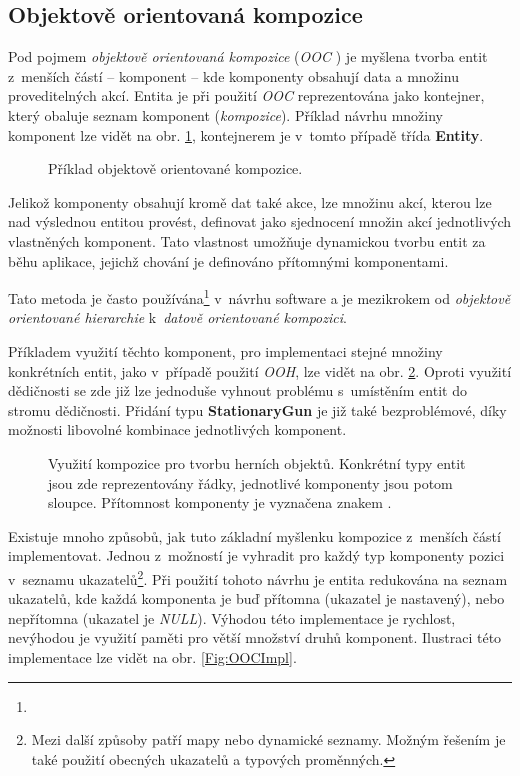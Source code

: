 \subsection{Objektově orientovaná kompozice}

Pod pojmem \emph{objektově orientovaná kompozice} (\emph{OOC} \cite{GameDesignPatterns}) je myšlena tvorba entit z~menších částí -- komponent -- kde komponenty obsahují data a množinu proveditelných akcí. Entita je při použití \emph{OOC} reprezentována jako kontejner, který obaluje seznam komponent (\emph{kompozice}). Příklad návrhu množiny komponent lze vidět na obr. \ref{Fig:OOCHierarchy}, kontejnerem je v~tomto případě třída \textbf{Entity}.

\begin{figure}[H]
	\centering
	\caption{Příklad objektově orientované kompozice.}
	\label{Fig:OOCHierarchy}
\end{figure}

Jelikož komponenty obsahují kromě dat také akce, lze množinu akcí, kterou lze nad výslednou entitou provést, definovat jako sjednocení množin akcí jednotlivých vlastněných komponent. Tato vlastnost umožňuje dynamickou tvorbu entit za běhu aplikace, jejichž chování je definováno přítomnými komponentami.

Tato metoda je často používána\footnote{} v~návrhu software a je mezikrokem od \emph{objektově orientované hierarchie} k~\emph{datově orientované kompozici}. 

Příkladem využití těchto komponent, pro implementaci stejné množiny konkrétních entit, jako v~případě použití \emph{OOH}, lze vidět na obr. \ref{Fig:OOCEntity}. Oproti využití dědičnosti se zde již lze jednoduše vyhnout problému s~umístěním entit do stromu dědičnosti. Přidání typu \textbf{StationaryGun} je již také bezproblémové, díky možnosti libovolné kombinace jednotlivých komponent.

\begin{figure}[H]
	\centering
	\caption{Využití kompozice pro tvorbu herních objektů. Konkrétní typy entit jsou zde reprezentovány řádky, jednotlivé komponenty jsou potom sloupce. Přítomnost komponenty je vyznačena znakem .}
	\label{Fig:OOCEntity}
\end{figure}

Existuje mnoho způsobů, jak tuto základní myšlenku kompozice z~menších částí implementovat. Jednou z~možností je vyhradit pro každý typ komponenty pozici v~seznamu ukazatelů\footnote{Mezi další způsoby patří mapy nebo dynamické seznamy. Možným řešením je také použití obecných ukazatelů a typových proměnných. }. Při použití tohoto návrhu je entita redukována na seznam ukazatelů, kde každá komponenta je buď přítomna (ukazatel je nastavený), nebo nepřítomna (ukazatel je \emph{NULL}). Výhodou této implementace je rychlost, nevýhodou je využití paměti pro větší množství druhů komponent. Ilustraci této implementace lze vidět na obr. \ref{Fig:OOCImpl}. 

